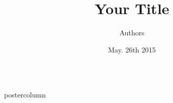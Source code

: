\documentclass[final]{beamer}
\title{\huge Your Title }
\author{Authors }
\institute[Univerist\'e de Bourgogne]{Institute and Universities }
\date[May. 26th 2015]{May. 26th 2015}
\newlength{\columnheight}
\begin{document}
\begin{frame}
  \begin{columns}
    
    \begin{column}{.33\textwidth}
      \begin{beamercolorbox}[center,wd=\textwidth]{postercolumn}
        \begin{minipage}[T]{.95\textwidth}  %
          \parbox[t][\columnheight]{\textwidth}{ %

}
\end{minipage}
\end{beamercolorbox}
\end{column}
\end{columns}
\end{frame}
\end{document}
